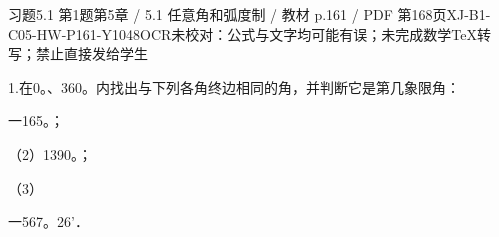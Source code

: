 \begin{bankitem}{习题5.1 第1题}{第5章 / 5.1 任意角和弧度制 / 教材 p.161 / PDF 第168页}{XJ-B1-C05-HW-P161-Y1048}{OCR未校对：公式与文字均可能有误；未完成数学TeX转写；禁止直接发给学生}
\begin{ocrdraft}
\par
1.在0。、360。内找出与下列各角终边相同的角，并判断它是第几象限角：
\par
一165。；
\par
（2）1390。；
\par
（3）
\par
一567。26'．
\end{ocrdraft}
\end{bankitem}

